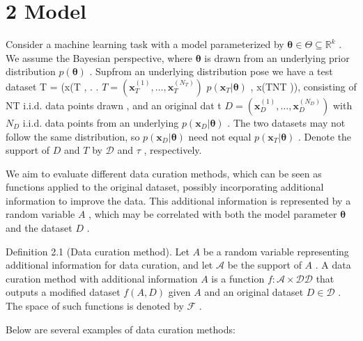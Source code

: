 \section{2 Model}\label{model}

Consider a machine learning task with a model parameterized by
\(\pmb { \theta } \in \Theta \subseteq \mathbb { R } ^ { k }\) . We
assume the Bayesian perspective, where \(\pmb \theta\) is drawn from an
underlying prior distribution \(p ( \pmb \theta )\) . Supfrom an
underlying distribution pose we have a test dataset T = (x(T , . .
\(T = ( \mathbf { x } _ { T } ^ { ( 1 ) } , \dots , \mathbf { x } _ { T } ^ { ( N _ { T } ) } )\)
\(p ( \mathbf { x } _ { T } | \pmb { \theta } )\) , x(TNT )), consisting
of NT i.i.d. data points drawn , and an original dat t
\(D = ( \mathbf { x } _ { D } ^ { ( 1 ) } , \dots , \mathbf { x } _ { D } ^ { ( N _ { D } ) } )\)
with \(N _ { D }\) i.i.d. data points from an underlying
\(p ( \mathbf { x } _ { D } | \pmb { \theta } )\) . The two datasets may
not follow the same distribution, so
\(p ( \mathbf { x } _ { D } | \pmb { \theta } )\) need not equal
\(p ( \mathbf { x } _ { T } | \pmb { \theta } )\) . Denote the support
of \(D\) and \(T\) by \(\mathcal { D }\) and \(\tau\) , respectively.

We aim to evaluate different data curation methods, which can be seen as
functions applied to the original dataset, possibly incorporating
additional information to improve the data. This additional information
is represented by a random variable \(A\) , which may be correlated with
both the model parameter \(\pmb \theta\) and the dataset \(D\) .

Definition 2.1 (Data curation method). Let \(A\) be a random variable
representing additional information for data curation, and let
\(\mathcal { A }\) be the support of \(A\) . A data curation method with
additional information \(A\) is a function
\(f : \mathcal { A } \times \mathcal { D }  \mathcal { D }\) that
outputs a modified dataset \(f ( A , D )\) given \(A\) and an original
dataset \(D \in { \mathcal { D } }\) . The space of such functions is
denoted by \(\mathcal { F }\) .

Below are several examples of data curation methods:

